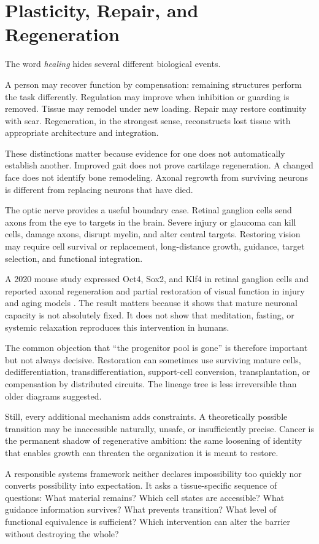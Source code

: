 \chapter{Plasticity, Repair, and Regeneration}\label{chapter-8-plasticity-repair-and-regeneration}

The word \emph{healing} hides several different biological events.

A person may recover function by compensation: remaining structures perform the task differently. Regulation may improve when inhibition or guarding is removed. Tissue may remodel under new loading. Repair may restore continuity with scar. Regeneration, in the strongest sense, reconstructs lost tissue with appropriate architecture and integration.

These distinctions matter because evidence for one does not automatically establish another. Improved gait does not prove cartilage regeneration. A changed face does not identify bone remodeling. Axonal regrowth from surviving neurons is different from replacing neurons that have died.

The optic nerve provides a useful boundary case. Retinal ganglion cells send axons from the eye to targets in the brain. Severe injury or glaucoma can kill cells, damage axons, disrupt myelin, and alter central targets. Restoring vision may require cell survival or replacement, long-distance growth, guidance, target selection, and functional integration.

A 2020 mouse study expressed Oct4, Sox2, and Klf4 in retinal ganglion cells and reported axonal regeneration and partial restoration of visual function in injury and aging models \autocite{lu2020reprogramming}. The result matters because it shows that mature neuronal capacity is not absolutely fixed. It does not show that meditation, fasting, or systemic relaxation reproduces this intervention in humans.

The common objection that ``the progenitor pool is gone'' is therefore important but not always decisive. Restoration can sometimes use surviving mature cells, dedifferentiation, transdifferentiation, support-cell conversion, transplantation, or compensation by distributed circuits. The lineage tree is less irreversible than older diagrams suggested.

Still, every additional mechanism adds constraints. A theoretically possible transition may be inaccessible naturally, unsafe, or insufficiently precise. Cancer is the permanent shadow of regenerative ambition: the same loosening of identity that enables growth can threaten the organization it is meant to restore.

A responsible systems framework neither declares impossibility too quickly nor converts possibility into expectation. It asks a tissue-specific sequence of questions: What material remains? Which cell states are accessible? What guidance information survives? What prevents transition? What level of functional equivalence is sufficient? Which intervention can alter the barrier without destroying the whole?

